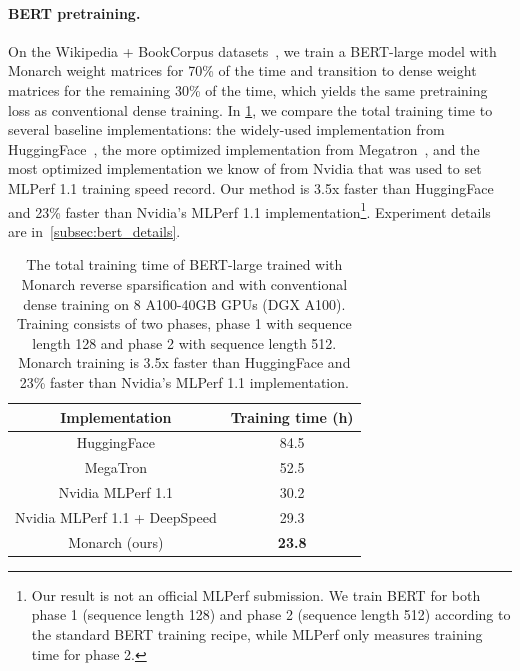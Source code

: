 \paragraph{BERT pretraining.}
On the Wikipedia + BookCorpus datasets~\citep{zhu2015aligning}, we train a BERT-large model with Monarch weight matrices for 70\% of the time and transition to dense weight matrices for the remaining 30\% of the time, which yields the same pretraining loss as conventional dense training.
In \cref{table:bert_speed}, we compare the total training time to several baseline implementations: the widely-used implementation from HuggingFace~\citep{wolf-etal-2020-transformers}, the more optimized implementation from Megatron~\citep{shoeybi2019megatron}, and the most optimized implementation we know of from Nvidia that was used to set MLPerf 1.1 training speed record. Our method is 3.5x faster than HuggingFace and 23\% faster than Nvidia's MLPerf 1.1 implementation\footnote{Our result is not an official MLPerf submission. We train BERT for both phase 1 (sequence length 128) and phase 2 (sequence length 512) according to the standard BERT training recipe\cite{devlin2018bert}, while MLPerf only measures training time for phase 2.}.
Experiment details are in~\cref{subsec:bert_details}.

\begin{table}[h]
  \small
  \centering
  \caption{\label{table:bert_speed}The total training time of BERT-large trained with Monarch reverse sparsification and with conventional dense training on 8 A100-40GB GPUs (DGX A100). Training consists of two phases, phase 1 with sequence length 128 and phase 2 with sequence length 512. Monarch training is 3.5x faster than HuggingFace and 23\% faster than Nvidia's MLPerf 1.1 implementation.}
  \vspace{1em}
  \iftoggle{arxiv}{}{
    \resizebox{\linewidth}{!}
  }
  {
    \begin{tabular}{@{}c||c@{}}
      Implementation & Training time (h)  \\ \hline
      HuggingFace &  84.5 \\
      MegaTron & 52.5 \\
      Nvidia MLPerf 1.1 & 30.2 \\
      Nvidia MLPerf 1.1 + DeepSpeed & 29.3 \\
      Monarch (ours) & \textbf{23.8} \\
    \end{tabular}
  }
  \vspace{-3mm}
\end{table}

